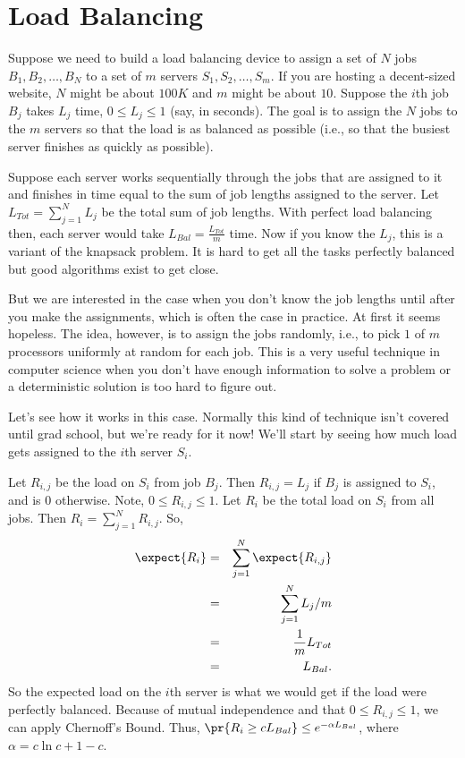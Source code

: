 \section{Load Balancing}
Suppose we need to build a load balancing device to assign a set of $N$ jobs $B_1, B_2, \ldots, B_N$ to a set of $m$ servers $S_1, S_2, \ldots, S_m$. If you are hosting a decent-sized website, $N$ might be about $100K$ and $m$ might be about $10$. Suppose the $i$th job $B_j$ takes $L_j$ time, $0 \leq L_j \leq 1$ (say, in seconds). The goal is to assign the $N$ jobs to the $m$ servers so that the load is as balanced as possible (i.e., so that the busiest server finishes as quickly as possible). 

Suppose each server works sequentially through the jobs that are assigned to it and finishes in time equal to the sum of job lengths assigned to the server. Let $L_{Tot} = \sum_{j=1}^N L_j$ be the total sum of job lengths. With perfect load balancing then, each server would take $L_{Bal} = \frac{L_{Tot}}{m}$ time. Now if you know the $L_j$, this is a variant of the knapsack problem. It is hard to get all the tasks perfectly balanced but good algorithms exist to get close.

But we are interested in the case when you don't know the job lengths until after you make the assignments, which is often the case in practice. At first it seems hopeless. The idea, however, is to assign the jobs randomly, i.e., to pick $1$ of $m$ processors uniformly at random for each job. This is a very useful technique in computer science when you don't have enough information to solve a problem or a deterministic solution is too hard to figure out. 

Let's see how it works in this case. Normally this kind of technique isn't covered until grad school, but we're ready for it now! We'll start by seeing how much load gets assigned to the $i$th server $S_i$. 

Let $R_{i,j}$ be the load on $S_i$ from job $B_j$. Then $R_{i,j} = L_j$ if $B_j$ is assigned to $S_i$, and is $0$ otherwise. Note, $0 \leq R_{i,j} \leq 1$. Let $R_i$ be the total load on $S_i$ from all jobs. Then $R_i = \sum_{j=1}^N R_{i,j}$. So,
\begin{eqnarray*}
\expect{R_i} & = & \sum_{j=1}^N \expect{R_{i,j}} \\
& = & \sum_{j=1}^N L_j/m\\
& =& \frac{1}{m} L_{Tot}\\
& = & L_{Bal}.
\end{eqnarray*}
So the expected load on the $i$th server is what we would get if the load were perfectly balanced. Because of mutual independence and that $0 \leq R_{i,j} \leq 1$, we can apply Chernoff's Bound. Thus, $\pr{R_i \geq cL_{Bal}} \leq e^{-\alpha L_{Bal}}$, where $\alpha = c\ln c + 1-c$. 

